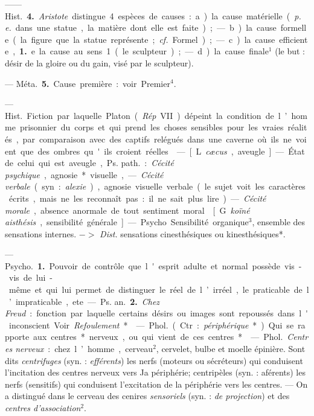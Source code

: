 \begin{itemize}[leftmargin=1cm, label=, itemsep=11pt]
—— \si{Hist.} {\bf 4.} {\it Aristote} distingue
4 espèces de causes : a) la cause matérielle ({\it p. e.} dans une statue, la
matière dont elle est faite); — b) la
cause formelle (la figure que la statue
représente; {\it cf.} Formel); — c) la
cause efficiente, {\bf 1.} e. la cause au sens 1
(le sculpteur); — d) la cause finale$^1$
(le but : désir de la gloire ou du gain,
visé par le sculpteur).

— \si{Méta.} {\bf 5.} Cause première : voir
Premier$^4$.

 — \si{Hist.}
Fiction par laquelle Platon ({\it Rép}
VII) dépeint la condition de l’homme
prisonnier du corps et qui prend les
%
choses sensibles pour les vraies réalités, par comparaison avec des
captifs relégués dans une caverne
où ils ne voient que des ombres
qu'ils croient réelles.

 — [L. {\it cæcus}, aveugle] — État
de celui qui est aveugle, \si{Ps. path.} :
{\it Cécité psychique}, agnosie* visuelle,
— {\it Cécité verbale} (syn. : {\it alexie}),
agnosie visuelle verbale (le sujet
voit les caractères écrits, mais ne les
reconnaît pas : il ne sait plus lire).
— {\it Cécité morale}, absence anormale
de tout sentiment moral.

 [G. {\it koïné
aisthésis}, sensibilité générale]. —
Psycho. Sensibilité organique$^3$, ensemble des sensations internes.
$->$ {\it Dist.} sensations cinesthésiques
ou kinesthésiques*.

 — \si{Psycho.} {\bf 1.} Pouvoir de
contrôle que l'esprit adulte et normal possède vis-vis de lui-même
et qui lui permet de distinguer le
réel de l’irréel, le praticable de l’impraticable, ete. — \si{Ps. an.} {\bf 2.} {\it Chez
Freud} : fonction par laquelle certains désirs ou images sont repoussés
dans l'inconscient. Voir {\it Refoulement}*.

 — \si{Phol.} (Ctr. : {\it périphérique}*).
Qui se rapporte aux centres* nerveux, ou qui vient de ces centres*.

 — \si{Phol.} {\it Centres nerveux} :
chez l’homme, cerveau$^2$, cervelet,
bulbe et moelle épinière. Sont dits
{\it centrifuges} (syn. : {\it efférents}) les nerfs
(moteurs ou sécréteurs) qui conduisent l'incitation des centres nerveux
vers Ja périphérie; centripèles (syn. :
aférents) les nerfs (sensitifs) qui
conduisent l'excitation de la périphérie vers les centres. — On a distingué dans le cerveau des cenires
{\it sensoriels} (syn. : {\it de projection}) et des
{\it centres d'association}$^2$.


\end{itemize}
